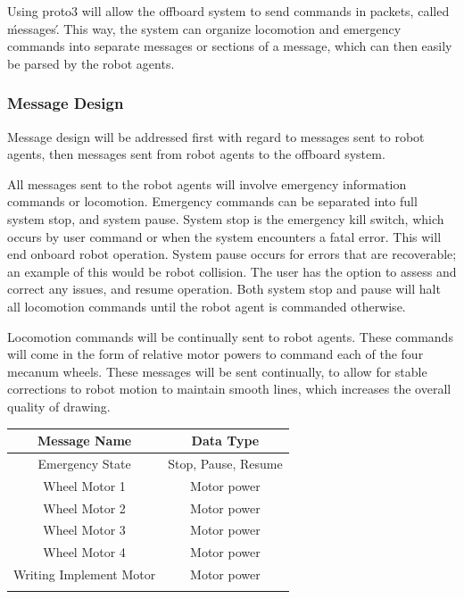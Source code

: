 Using proto3 will allow the offboard system to send commands in packets, called \'messages\'. This way, the system can organize locomotion and emergency commands into separate messages or sections of a message, which can then easily be parsed by the robot agents.

\subsubsection{Message Design}
\label{sec:software_comm_msg}
Message design will be addressed first with regard to messages sent to robot agents, then messages sent from robot agents to the offboard system.

All messages sent to the robot agents will involve emergency information commands or locomotion. Emergency commands can be separated into full system stop, and system pause. System stop is the emergency kill switch, which occurs by user command or when the system encounters a fatal error. This will end onboard robot operation. System pause occurs for errors that are recoverable; an example of this would be robot collision. The user has the option to assess and correct any issues, and resume operation. Both system stop and pause will halt all locomotion commands until the robot agent is commanded otherwise.

Locomotion commands will be continually sent to robot agents. These commands will come in the form of relative motor powers to command each of the four mecanum wheels. These messages will be sent continually, to allow for stable corrections to robot motion to maintain smooth lines, which increases the overall quality of drawing. 

\begin{center}
 \begin{tabular}{||c c ||}
 \hline
 Message Name & Data Type \\ [0.5ex]
 \hline\hline
 Emergency State & Stop, Pause, Resume \\
 \hline
 Wheel Motor 1 & Motor power \\
 \hline
 Wheel Motor 2 & Motor power \\
 \hline
 Wheel Motor 3 & Motor power \\
 \hline
 Wheel Motor 4 & Motor power \\
 \hline
 Writing Implement Motor & Motor power \\
 \hline\\ [1ex]
\end{tabular}
\end{center}

